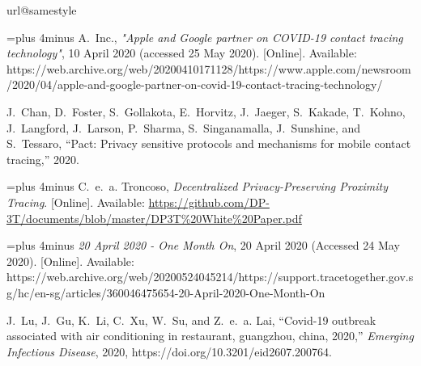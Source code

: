\documentclass[11pt]{article}
\begin{document}
\begin{thebibliography}{10}
\providecommand{\url}[1]{#1}
\csname url@samestyle\endcsname
\providecommand{\newblock}{\relax}
\providecommand{\bibinfo}[2]{#2}
\providecommand{\BIBentrySTDinterwordspacing}{\spaceskip=0pt\relax}
\providecommand{\BIBentryALTinterwordstretchfactor}{4}
\providecommand{\BIBentryALTinterwordspacing}{\spaceskip=\fontdimen2\font plus
\BIBentryALTinterwordstretchfactor\fontdimen3\font minus
  \fontdimen4\font\relax}
\providecommand{\BIBforeignlanguage}[2]{{%
\expandafter\ifx\csname l@#1\endcsname\relax
\typeout{** WARNING: IEEEtran.bst: No hyphenation pattern has been}%
\typeout{** loaded for the language `#1'. Using the pattern for}%
\typeout{** the default language instead.}%
\else
\language=\csname l@#1\endcsname
\fi
#2}}
\providecommand{\BIBdecl}{\relax}
\BIBdecl

\BIBentryALTinterwordspacing
A.~Inc., \emph{"Apple and Google partner on COVID-19 contact tracing
  technology"}, 10 April 2020 (accessed 25 May 2020). [Online]. Available:
  \url{https://web.archive.org/web/20200410171128/https://www.apple.com/newsroom/2020/04/apple-and-google-partner-on-covid-19-contact-tracing-technology/}
\BIBentrySTDinterwordspacing

J.~Chan, D.~Foster, S.~Gollakota, E.~Horvitz, J.~Jaeger, S.~Kakade, T.~Kohno,
  J.~Langford, J.~Larson, P.~Sharma, S.~Singanamalla, J.~Sunshine, and
  S.~Tessaro, ``Pact: Privacy sensitive protocols and mechanisms for mobile
  contact tracing,'' 2020.

\BIBentryALTinterwordspacing
C.~e.~a. Troncoso, \emph{Decentralized Privacy-Preserving Proximity Tracing}.
  [Online]. Available:
  \url{https://github.com/DP-3T/documents/blob/master/DP3T%20White%20Paper.pdf}
\BIBentrySTDinterwordspacing

\BIBentryALTinterwordspacing
\emph{20 April 2020 - One Month On}, 20 April 2020 (Accessed 24 May 2020).
  [Online]. Available:
  \url{https://web.archive.org/web/20200524045214/https://support.tracetogether.gov.sg/hc/en-sg/articles/360046475654-20-April-2020-One-Month-On}
\BIBentrySTDinterwordspacing

J.~Lu, J.~Gu, K.~Li, C.~Xu, W.~Su, and Z.~e.~a. Lai, ``Covid-19 outbreak
  associated with air conditioning in restaurant, guangzhou, china, 2020,''
  \emph{Emerging Infectious Disease}, 2020,
  https://doi.org/10.3201/eid2607.200764.


\end{thebibliography}
\end{document}
